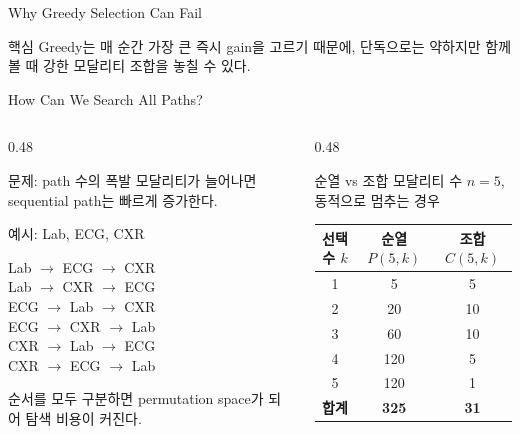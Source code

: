 \documentclass[
11pt,notheorems,hyperref={pdfauthor=whatever}
]{beamer}
\begin{document}
\begin{frame}{Why Greedy Selection Can Fail}

\vspace{0.25em}
\begin{alertblock}{핵심}
\scriptsize
Greedy는 매 순간 가장 큰 즉시 gain을 고르기 때문에, 단독으로는 약하지만 함께 볼 때 강한 모달리티 조합을 놓칠 수 있다.
\end{alertblock}
\end{frame}

\begin{frame}{How Can We Search All Paths?}
\vspace{0.2em}
\begin{columns}[T,onlytextwidth]
\begin{column}{0.48\textwidth}
\begin{block}{문제: path 수의 폭발}
\scriptsize
모달리티가 늘어나면 sequential path는 빠르게 증가한다.

\vspace{0.4em}
예시: Lab, ECG, CXR

\vspace{0.25em}
Lab $\rightarrow$ ECG $\rightarrow$ CXR\\
Lab $\rightarrow$ CXR $\rightarrow$ ECG\\
ECG $\rightarrow$ Lab $\rightarrow$ CXR\\
ECG $\rightarrow$ CXR $\rightarrow$ Lab\\
CXR $\rightarrow$ Lab $\rightarrow$ ECG\\
CXR $\rightarrow$ ECG $\rightarrow$ Lab

\vspace{0.4em}
순서를 모두 구분하면 permutation space가 되어 탐색 비용이 커진다.
\end{block}
\end{column}
\begin{column}{0.48\textwidth}
\begin{alertblock}{순열 vs 조합}
\scriptsize
모달리티 수 $n=5$, 동적으로 멈추는 경우

\vspace{0.35em}
\begin{center}
\begin{tabular}{c|c|c}
\textbf{선택 수 $k$} & \textbf{순열 $P(5,k)$} & \textbf{조합 $C(5,k)$}\\
\hline
1 & 5 & 5\\
2 & 20 & 10\\
3 & 60 & 10\\
4 & 120 & 5\\
5 & 120 & 1\\
\hline
\textbf{합계} & \textbf{325} & \textbf{31}
\end{tabular}
\end{center}


\end{alertblock}
\end{column}
\end{columns}
\end{frame}
\end{document}
